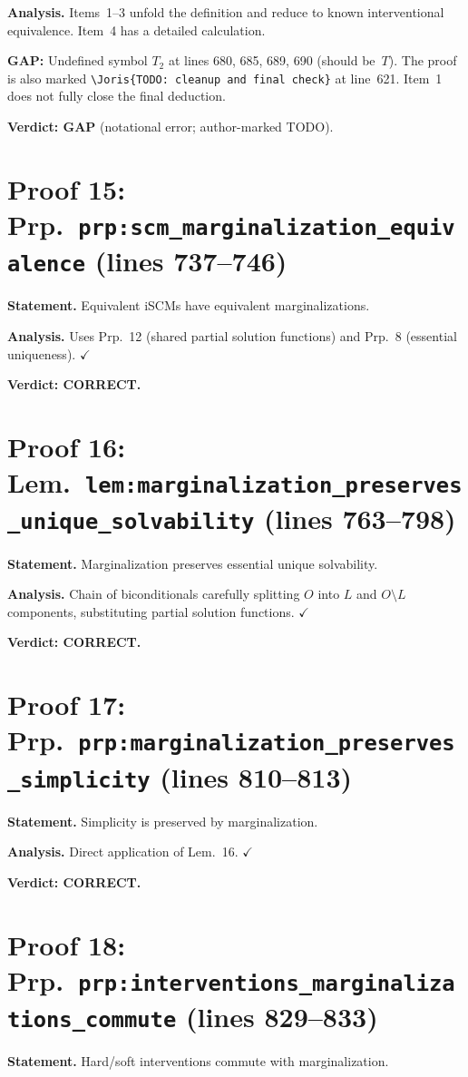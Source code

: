 \documentclass{article}
\begin{document}
\textbf{Analysis.} Items~1--3 unfold the definition and reduce to known
interventional equivalence.  Item~4 has a detailed calculation.

\textbf{GAP:} Undefined symbol $T_2$ at lines 680, 685, 689, 690 (should be~$T$).
The proof is also marked \verb|\Joris{TODO: cleanup and final check}| at line~621.
Item~1 does not fully close the final deduction.

\textbf{Verdict: GAP} (notational error; author-marked TODO).

\section{Proof 15: Prp.\ \texttt{prp:scm\_marginalization\_equivalence}
(lines 737--746)}
\textbf{Statement.} Equivalent iSCMs have equivalent marginalizations.

\textbf{Analysis.} Uses Prp.~12 (shared partial solution functions) and
Prp.~8 (essential uniqueness).  $\checkmark$

\textbf{Verdict: CORRECT.}

\section{Proof 16: Lem.\ \texttt{lem:marginalization\_preserves\_unique\_solvability}
(lines 763--798)}
\textbf{Statement.} Marginalization preserves essential unique solvability.

\textbf{Analysis.} Chain of biconditionals carefully splitting $O$ into $L$ and
$O\setminus L$ components, substituting partial solution functions.  $\checkmark$

\textbf{Verdict: CORRECT.}

\section{Proof 17: Prp.\ \texttt{prp:marginalization\_preserves\_simplicity}
(lines 810--813)}
\textbf{Statement.} Simplicity is preserved by marginalization.

\textbf{Analysis.} Direct application of Lem.~16.  $\checkmark$

\textbf{Verdict: CORRECT.}

\section{Proof 18: Prp.\ \texttt{prp:interventions\_marginalizations\_commute}
(lines 829--833)}
\textbf{Statement.} Hard/soft interventions commute with marginalization.
\end{document}
